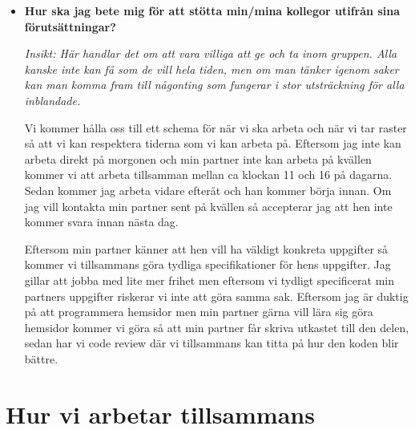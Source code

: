 \documentclass{mall}
\begin{document}
\begin{itemize}
\item \textbf{Hur ska jag bete mig för att stötta min/mina kollegor utifrån sina förutsättningar?}

 \emph{ Insikt: Här handlar det om att vara villiga att ge och ta inom gruppen. Alla kanske inte kan få som de vill
  hela tiden, men om man tänker igenom saker kan man komma fram till någonting som fungerar i stor utsträckning
  för alla inblandade.}

  Vi kommer hålla oss till ett schema för när vi ska arbeta och när vi tar raster så att vi kan respektera
  tiderna som vi kan arbeta på. Eftersom jag inte kan arbeta direkt på morgonen och min partner inte kan
  arbeta på kvällen kommer vi att arbeta tillsamman mellan ca klockan 11 och 16 på dagarna. Sedan kommer
  jag arbeta vidare efteråt och han kommer börja innan. Om jag vill kontakta min partner sent på kvällen
  så accepterar jag att hen inte kommer svara innan nästa dag.

  Eftersom min partner känner att hen vill ha väldigt konkreta uppgifter så kommer vi tillsammans göra tydliga
  specifikationer för hens uppgifter. Jag gillar att jobba med lite mer frihet men eftersom vi tydligt specificerat
  min partners uppgifter riskerar vi inte att göra samma sak. Eftersom jag är duktig på att programmera hemsidor men
  min partner gärna vill lära sig göra hemsidor kommer vi göra så att min partner får skriva utkastet till den delen,
  sedan har vi code review där vi tillsammans kan titta på hur den koden blir bättre.


\end{itemize}

\section{Hur vi arbetar tillsammans}
\end{document}
